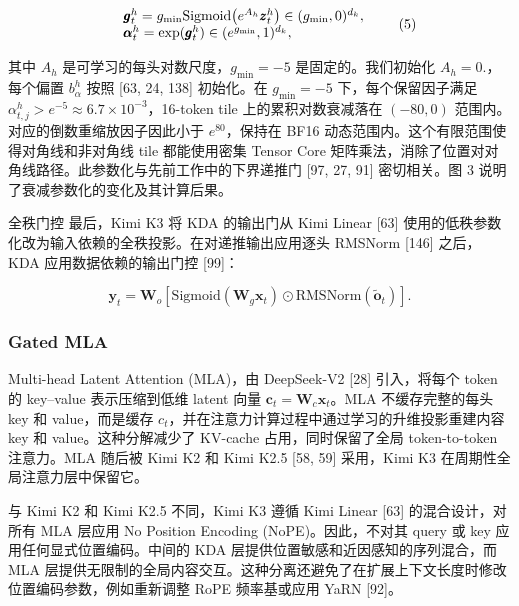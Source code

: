 \[
\begin{array}{r l} & {\pmb {g} _ {t} ^ {h} = g _ {\mathrm{min}} \mathrm{Sigmoid} \big (e ^ {A _ {h}} \pmb {z} _ {t} ^ {h} \big) \in (g _ {\mathrm{min}}, 0) ^ {d _ {k}},} \\ & {\pmb {\alpha} _ {t} ^ {h} = \exp (\pmb {g} _ {t} ^ {h}) \in (e ^ {g _ {\mathrm{min}}}, 1) ^ {d _ {k}},} \end{array}\tag{5}
\]

其中 \(A _ { h }\) 是可学习的每头对数尺度，\(g _ { \mathrm { m i n } } = - 5\) 是固定的。我们初始化 \(A _ { h } = 0 .\)，每个偏置 \(b _ { \alpha } ^ { h }\) 按照 {[}63, 24, 138{]} 初始化。在 \(g _ { \mathrm { m i n } } = - 5\) 下，每个保留因子满足 \(\alpha _ { t , j } ^ { h } > e ^ { - 5 } \approx 6 . 7 \times 1 0 ^ { - 3 }\)，16-token tile 上的累积对数衰减落在 \(( - 8 0 , 0 )\) 范围内。对应的倒数重缩放因子因此小于 \(e ^ { 8 0 }\)，保持在 BF16 动态范围内。这个有限范围使得对角线和非对角线 tile 都能使用密集 Tensor Core 矩阵乘法，消除了位置对对角线路径。此参数化与先前工作中的下界递推门 {[}97, 27, 91{]} 密切相关。图 3 说明了衰减参数化的变化及其计算后果。

全秩门控 最后，Kimi K3 将 KDA 的输出门从 Kimi Linear {[}63{]} 使用的低秩参数化改为输入依赖的全秩投影。在对递推输出应用逐头 RMSNorm {[}146{]} 之后，KDA 应用数据依赖的输出门控 {[}99{]}：

\[
\boldsymbol {y} _ {t} = \mathbf {W} _ {o} [ \mathrm{Sigmoid} (\mathbf {W} _ {g} \boldsymbol {x} _ {t}) \odot \mathrm{RMSNorm} (\tilde {\boldsymbol {o}} _ {t}) ].\tag{6}
\]

\subsubsection{Gated MLA}\label{gated-mla}

Multi-head Latent Attention (MLA)，由 DeepSeek-V2 {[}28{]} 引入，将每个 token 的 key--value 表示压缩到低维 latent 向量 \(\pmb { c } _ { t } = \mathbf { W } _ { c } \pmb { x } _ { t }\)。MLA 不缓存完整的每头 key 和 value，而是缓存 \(c _ { t }\)，并在注意力计算过程中通过学习的升维投影重建内容 key 和 value。这种分解减少了 KV-cache 占用，同时保留了全局 token-to-token 注意力。MLA 随后被 Kimi K2 和 Kimi K2.5 {[}58, 59{]} 采用，Kimi K3 在周期性全局注意力层中保留它。

与 Kimi K2 和 Kimi K2.5 不同，Kimi K3 遵循 Kimi Linear {[}63{]} 的混合设计，对所有 MLA 层应用 No Position Encoding (NoPE)。因此，不对其 query 或 key 应用任何显式位置编码。中间的 KDA 层提供位置敏感和近因感知的序列混合，而 MLA 层提供无限制的全局内容交互。这种分离还避免了在扩展上下文长度时修改位置编码参数，例如重新调整 RoPE 频率基或应用 YaRN {[}92{]}。

